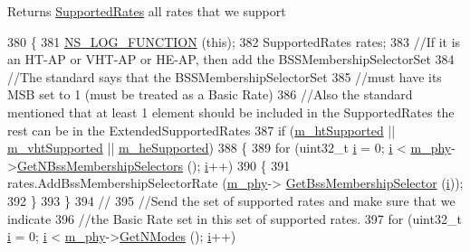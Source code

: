 \begin{DoxyReturn}{Returns}
\hyperlink{classns3_1_1SupportedRates}{Supported\+Rates} all rates that we support 
\end{DoxyReturn}

\begin{DoxyCode}
380 \{
381   \hyperlink{log-macros-disabled_8h_a90b90d5bad1f39cb1b64923ea94c0761}{NS\_LOG\_FUNCTION} (\textcolor{keyword}{this});
382   SupportedRates rates;
383   \textcolor{comment}{//If it is an HT-AP or VHT-AP or HE-AP, then add the BSSMembershipSelectorSet}
384   \textcolor{comment}{//The standard says that the BSSMembershipSelectorSet}
385   \textcolor{comment}{//must have its MSB set to 1 (must be treated as a Basic Rate)}
386   \textcolor{comment}{//Also the standard mentioned that at least 1 element should be included in the SupportedRates the rest
       can be in the ExtendedSupportedRates}
387   \textcolor{keywordflow}{if} (\hyperlink{classns3_1_1RegularWifiMac_a8950c44b8cf2ad1f9274821cf88adc7b}{m\_htSupported} || \hyperlink{classns3_1_1RegularWifiMac_a151f330fdeb3f83f9ec7cf07537f0e86}{m\_vhtSupported} || 
      \hyperlink{classns3_1_1RegularWifiMac_a9458143c722fa0b6e5d223d41585842a}{m\_heSupported})
388     \{
389       \textcolor{keywordflow}{for} (uint32\_t \hyperlink{bernuolliDistribution_8m_a6f6ccfcf58b31cb6412107d9d5281426}{i} = 0; \hyperlink{bernuolliDistribution_8m_a6f6ccfcf58b31cb6412107d9d5281426}{i} < \hyperlink{classns3_1_1RegularWifiMac_a1a6dad8eb0a057a4e1b459f518457a4c}{m\_phy}->\hyperlink{classns3_1_1WifiPhy_a0d5b168ddf02c7df51f83004454232c2}{GetNBssMembershipSelectors} (); 
      \hyperlink{bernuolliDistribution_8m_a6f6ccfcf58b31cb6412107d9d5281426}{i}++)
390         \{
391           rates.AddBssMembershipSelectorRate (\hyperlink{classns3_1_1RegularWifiMac_a1a6dad8eb0a057a4e1b459f518457a4c}{m\_phy}->
      \hyperlink{classns3_1_1WifiPhy_a3b6817c0140f083292ef70333d1c78c3}{GetBssMembershipSelector} (\hyperlink{bernuolliDistribution_8m_a6f6ccfcf58b31cb6412107d9d5281426}{i}));
392         \}
393     \}
394   \textcolor{comment}{//}
395   \textcolor{comment}{//Send the set of supported rates and make sure that we indicate}
396   \textcolor{comment}{//the Basic Rate set in this set of supported rates.}
397   \textcolor{keywordflow}{for} (uint32\_t \hyperlink{bernuolliDistribution_8m_a6f6ccfcf58b31cb6412107d9d5281426}{i} = 0; \hyperlink{bernuolliDistribution_8m_a6f6ccfcf58b31cb6412107d9d5281426}{i} < \hyperlink{classns3_1_1RegularWifiMac_a1a6dad8eb0a057a4e1b459f518457a4c}{m\_phy}->\hyperlink{classns3_1_1WifiPhy_a2467e56b69d64bb2d648302f39397317}{GetNModes} (); \hyperlink{bernuolliDistribution_8m_a6f6ccfcf58b31cb6412107d9d5281426}{i}++)

\end{DoxyCode}
